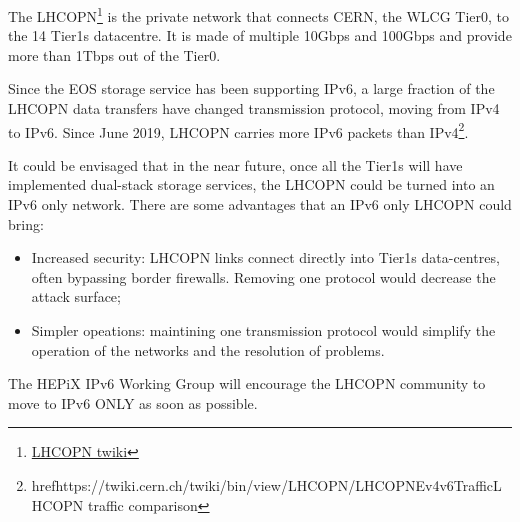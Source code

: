 
The LHCOPN\footnote{\href{https://twiki.cern.ch/twiki/bin/view/LHCOPN/WebHome}{LHCOPN twiki}} is the private network that connects CERN, the WLCG Tier0, to the 14 Tier1s datacentre. It is made of multiple 10Gbps and 100Gbps and provide more than 1Tbps out of the Tier0.

Since the EOS storage service has been supporting IPv6, a large fraction of the LHCOPN data transfers have changed transmission protocol, moving from IPv4 to IPv6. Since June 2019, LHCOPN carries more IPv6 packets than IPv4\footnote{href{https://twiki.cern.ch/twiki/bin/view/LHCOPN/LHCOPNEv4v6Traffic}{LHCOPN traffic comparison}}. 

It could be envisaged that in the near future, once all the Tier1s will have implemented dual-stack storage services, the LHCOPN could be turned into an IPv6 only network. There are some advantages that an IPv6 only LHCOPN could bring:
\begin{itemize}
  \item Increased security: LHCOPN links connect directly into Tier1s data-centres, often bypassing border firewalls. Removing one protocol would decrease the attack surface;
  \item Simpler opeations: maintining one transmission protocol would simplify the operation of the networks and the resolution of problems.
\end{itemize}

The HEPiX IPv6 Working Group will encourage the LHCOPN community to move to IPv6 ONLY as soon as possible.





